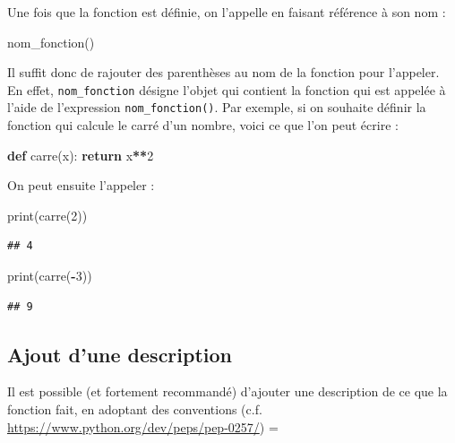 \documentclass[12pt,]{book}
\newenvironment{Shaded}{\begin{snugshade}}{\end{snugshade}}
\newcommand{\KeywordTok}[1]{\textcolor[rgb]{0.13,0.29,0.53}{\textbf{#1}}}
\newcommand{\DecValTok}[1]{\textcolor[rgb]{0.00,0.00,0.81}{#1}}
\newcommand{\ControlFlowTok}[1]{\textcolor[rgb]{0.13,0.29,0.53}{\textbf{#1}}}
\newcommand{\OperatorTok}[1]{\textcolor[rgb]{0.81,0.36,0.00}{\textbf{#1}}}
\newcommand{\BuiltInTok}[1]{#1}
\newcommand{\NormalTok}[1]{#1}
\numberwithin{equation}{section}
\numberwithin{countremarque}{section}
\begin{document}
Une fois que la fonction est définie, on l'appelle en faisant référence
à son nom :

\begin{Shaded}
\begin{Highlighting}[]
\NormalTok{nom_fonction()}
\end{Highlighting}
\end{Shaded}

Il suffit donc de rajouter des parenthèses au nom de la fonction pour
l'appeler. En effet, \texttt{nom\_fonction} désigne l'objet qui contient
la fonction qui est appelée à l'aide de l'expression
\texttt{nom\_fonction()}. Par exemple, si on souhaite définir la
fonction qui calcule le carré d'un nombre, voici ce que l'on peut écrire
:

\begin{Shaded}
\begin{Highlighting}[]
\KeywordTok{def}\NormalTok{ carre(x):}
  \ControlFlowTok{return}\NormalTok{ x}\OperatorTok{**}\DecValTok{2}
\end{Highlighting}
\end{Shaded}

On peut ensuite l'appeler :

\begin{Shaded}
\begin{Highlighting}[]
\BuiltInTok{print}\NormalTok{(carre(}\DecValTok{2}\NormalTok{))}
\end{Highlighting}
\end{Shaded}

\begin{lstlisting}
## 4
\end{lstlisting}

\begin{Shaded}
\begin{Highlighting}[]
\BuiltInTok{print}\NormalTok{(carre(}\OperatorTok{-}\DecValTok{3}\NormalTok{))}
\end{Highlighting}
\end{Shaded}

\begin{lstlisting}
## 9
\end{lstlisting}

\subsection{Ajout d'une description}\label{ajout-dune-description}

Il est possible (et fortement recommandé) d'ajouter une description de
ce que la fonction fait, en adoptant des conventions (c.f.
\url{https://www.python.org/dev/peps/pep-0257/}) =
\end{document}
